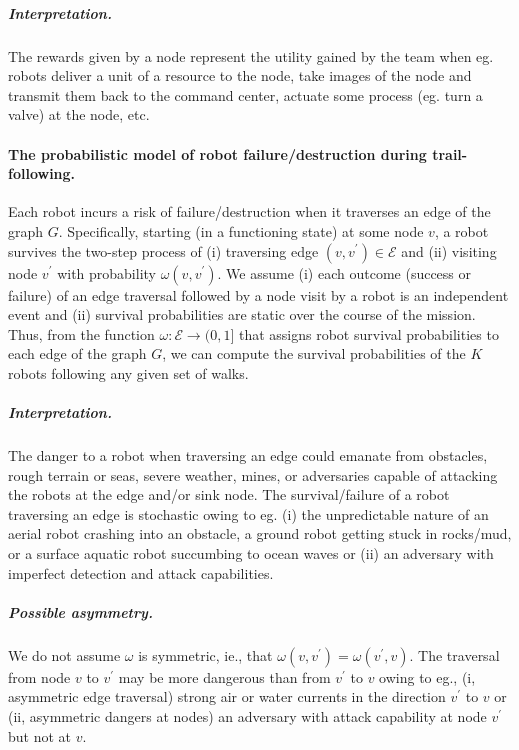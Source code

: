 \documentclass[11pt, oneside]{article}
\begin{document}
\vspace{-\baselineskip}
\subparagraph{Interpretation.} The rewards given by a node represent the utility gained by the team when eg. robots deliver a unit of a resource to the node, take images of the node and transmit them back to the command center, actuate some process (eg. turn a valve) at the node, etc. 


\paragraph{The probabilistic model of robot failure/destruction during trail-following.} 
Each robot incurs a risk of failure/destruction when it traverses an edge of the graph $G$.
Specifically, starting (in a functioning state) at some node $v$, a robot survives the two-step process of (i) traversing edge $(v, v^\prime) \in \mathcal{E}$ and (ii) visiting node $v^\prime$ with probability $\omega(v, v^\prime)$. 
We assume (i) each outcome (success or failure) of an edge traversal followed by a node visit by a robot is an independent event and (ii) survival probabilities are static over the course of the mission. 
Thus, from the function $\omega: \mathcal{E} \rightarrow (0, 1]$ that assigns robot survival probabilities to each edge of the graph $G$, we can compute the survival probabilities of the $K$ robots following any given set of walks.



\vspace{-\baselineskip}
\subparagraph{Interpretation.} The danger to a robot when traversing an edge could emanate from obstacles, rough terrain or seas, severe weather, mines, or adversaries capable of attacking the robots at the edge and/or sink node.
The survival/failure of a robot traversing an edge is stochastic owing to eg. (i) the unpredictable nature of an aerial robot crashing into an obstacle, a ground robot getting stuck in rocks/mud, or a surface aquatic robot succumbing to ocean waves or (ii) an adversary with imperfect detection and attack capabilities.

\vspace{-\baselineskip}
\subparagraph{Possible asymmetry.} We do not assume $\omega$ is symmetric, ie., that $\omega(v, v^\prime) = \omega(v^\prime, v)$. The traversal from node $v$ to $v^\prime$ may be more dangerous than from $v^\prime$ to $v$ owing to eg., (i, asymmetric edge traversal) strong air or water currents in the direction $v^\prime$ to $v$ or (ii, asymmetric dangers at nodes) an adversary with attack capability at node $v^\prime$ but not at $v$. %
\end{document}

